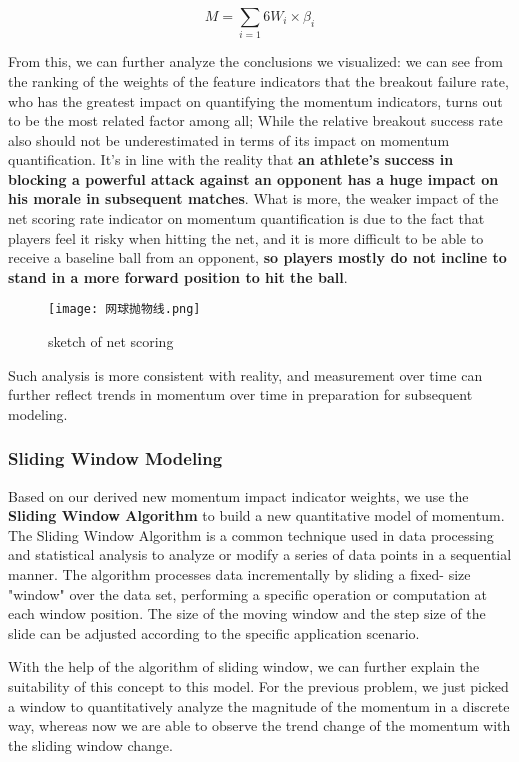 \documentclass{mcmthesis}
\begin{document}
\begin{equation} \label{14}
    M=\sum_{i=1}{6}W_{i}\times\beta _{i}
\end{equation}

From this, we can further analyze the conclusions we visualized: we can see from the ranking
of the weights of the feature indicators that the breakout failure rate, who has the greatest impact
on quantifying the momentum indicators, turns out to be the most related factor among all; While
the relative breakout success rate also should not be underestimated in terms of its impact on
momentum quantification. It's in line with the reality that {\bf an athlete's success in blocking a
powerful attack against an opponent has a huge impact on his morale in subsequent matches}. What is more, the weaker impact of the net scoring rate indicator on momentum
quantification is due to the fact that players feel it risky when hitting the net, and it is more
difficult to be able to receive a baseline ball from an opponent, {\bf so players mostly do not incline
to stand in a more forward position to hit the ball}.

\begin{figure}[htbp]
    \centering
    \texttt{[image: 网球抛物线.png]}
    \caption{sketch of net scoring} \label{Figure 17}
\end{figure}

Such analysis is more consistent with reality, and measurement over time can further reflect trends in momentum over time in preparation for subsequent modeling.

\subsubsection{Sliding Window Modeling}
Based on our derived new momentum impact indicator weights, we use the {\bf Sliding Window
Algorithm} to build a new quantitative model of momentum. The Sliding Window Algorithm is a
common technique used in data processing and statistical analysis to analyze or modify a series of
data points in a sequential manner. The algorithm processes data incrementally by sliding a fixed- size "window" over the data set, performing a specific operation or computation at each window
position. The size of the moving window and the step size of the slide can be adjusted according
to the specific application scenario. 

With the help of the algorithm of sliding window, we can further explain the suitability of this
concept to this model. For the previous problem, we just picked a window to quantitatively
analyze the magnitude of the momentum in a discrete way, whereas now we are able to observe
the trend change of the momentum with the sliding window change.
\end{document}

